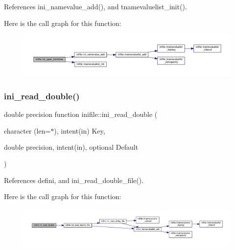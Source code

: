 References ini\+\_\+namevalue\+\_\+add(), and tnamevaluelist\+\_\+init().

Here is the call graph for this function\+:
\nopagebreak
\begin{figure}[H]
\begin{center}
\leavevmode
\includegraphics[width=350pt]{namespaceinifile_aaece0286cd984aadae94bf1212d74f9f_cgraph}
\end{center}
\end{figure}
\mbox{\label{namespaceinifile_a208e4c210b698f22b9087879ca1ed83e}} 
\subsubsection{\texorpdfstring{ini\+\_\+read\+\_\+double()}{ini\_read\_double()}}
{\footnotesize\ttfamily double precision function inifile\+::ini\+\_\+read\+\_\+double (\begin{DoxyParamCaption}\item[{character (len=$\ast$), intent(in)}]{Key,  }\item[{double precision, intent(in), optional}]{Default }\end{DoxyParamCaption})}



References defini, and ini\+\_\+read\+\_\+double\+\_\+file().

Here is the call graph for this function\+:
\nopagebreak
\begin{figure}[H]
\begin{center}
\leavevmode
\includegraphics[width=350pt]{namespaceinifile_a208e4c210b698f22b9087879ca1ed83e_cgraph}
\end{center}
\end{figure}
\mbox{\label{namespaceinifile_a0144764d1230507cd08723c17424daea}} 

